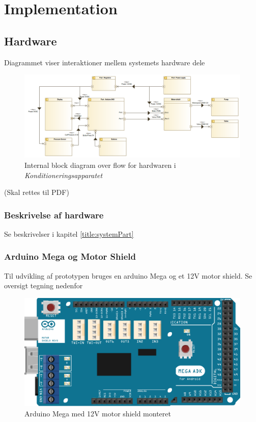 \section{Implementation}

\subsection{Hardware}
Diagrammet viser interaktioner mellem systemets hardware dele \\
\begin{figure}[H]
	\includegraphics[width=\textwidth]{pdfs/InternalBlockdiagram(Hardware).png}
	\caption{Internal block diagram over flow for hardwaren i \textit{Konditioneringsapparatet}}
\end{figure}
(Skal rettes til PDF)

\subsubsection{Beskrivelse af hardware}
Se beskrivelser i kapitel \ref{title:systemPart}

\subsubsection{Arduino Mega og Motor Shield}
Til udvikling af prototypen bruges en arduino Mega og et 12V motor shield. Se oversigt tegning nedenfor \\
\begin{figure}[H]
	\includegraphics[width=\textwidth]{pdfs/MegaPlusShield-crop.pdf}
	\caption{Arduino Mega med 12V motor shield monteret}
\end{figure}


